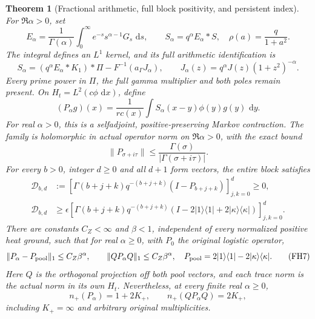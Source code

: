 \documentclass[11pt]{article}
\newtheorem{theorem}{Theorem}
\theoremstyle{remark}\newtheorem{remark}[theorem]{Remark}
\newcommand{\dd}{\,\mathrm d}
\begin{document}
\begin{theorem}[Fractional arithmetic, full block positivity, and persistent index]
\label{thm:fractional-complete-arithmetic}
For \(\Re\alpha>0\), set
\[
 E_\alpha=\frac1{\Gamma(\alpha)}
    \int_0^\infty e^{-s}s^{\alpha-1}G_s\,\dd s,
 \qquad S_\alpha=q^\alpha E_\alpha*S,
 \quad \rho(a)=\frac q{1+a^2}.                            \tag{FH2}
\]
The integral defines an \(L^1\) kernel, and its full arithmetic
identification is
\[
 S_\alpha=(q^\alpha E_\alpha*K_1)*\Pi
             -F^{-1}(a_\Gamma J_\alpha),\qquad
 J_\alpha(z)=q^\alpha J(z)(1+z^2)^{-\alpha}.              \tag{FH3}
\]
Every prime power in \(\Pi\), the full gamma multiplier and both poles
remain present. On \(H_t=L^2(c\phi\,\dd x)\), define
\[
 (P_\alpha g)(x)=\frac1{rc(x)}
             \int S_\alpha(x-y)\phi(y)g(y)\,\dd y.       \tag{FH4}
\]
For real \(\alpha>0\), this is a selfadjoint, positive-preserving
Markov contraction. The family is holomorphic in actual operator norm
on \(\Re\alpha>0\), with the exact bound
\[
 \|P_{\sigma+i\tau}\|\le
             \frac{\Gamma(\sigma)}{|\Gamma(\sigma+i\tau)|}.
                                                               \tag{FH5}
\]
For every \(b>0\), integer \(d\ge0\) and all \(d+1\) form vectors,
the entire block satisfies
\[
 \begin{split}
 \mathcal D_{b,d}
   &:=[\Gamma(b+j+k)q^{-(b+j+k)}(I-P_{b+j+k})]_{j,k=0}^d\ge0,\\
 \mathcal D_{b,d}
   &\ge\epsilon[\Gamma(b+j+k)q^{-(b+j+k)}
     (I-2|1\rangle\langle1|+2|\kappa\rangle\langle\kappa|)]_{j,k=0}^d .
 \end{split}                                                   \tag{FH6}
\]
There are constants \(C_Z<\infty\) and \(\beta<1\), independent of
every normalized positive heat ground, such that for real
\(\alpha\ge0\), with \(P_0\) the original logistic operator,
\[
 \|P_\alpha-P_{\rm pool}\|_1\le C_Z\beta^\alpha,
 \qquad \|QP_\alpha Q\|_1\le C_Z\beta^\alpha,
 \quad P_{\rm pool}=2|1\rangle\langle1|-2|\kappa\rangle\langle\kappa| .
                                                               \tag{FH7}
\]
Here \(Q\) is the orthogonal projection off both pool vectors, and
each trace norm is the actual norm in its own \(H_t\). Nevertheless,
at every finite real \(\alpha\ge0\),
\[
 n_+(P_\alpha)=1+2K_+,\qquad n_+(QP_\alpha Q)=2K_+,       \tag{FH8}
\]
including \(K_+=\infty\) and arbitrary original multiplicities.
\end{theorem}
\end{document}
